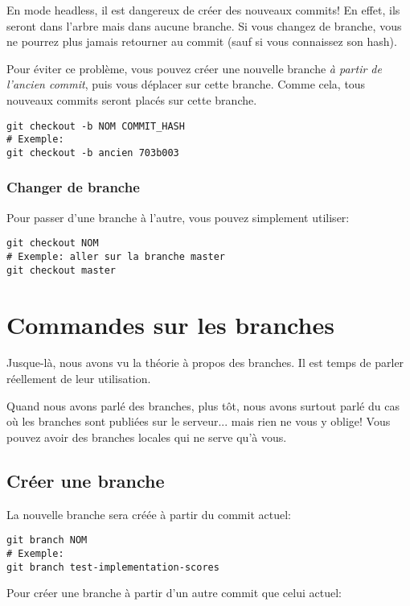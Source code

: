 \documentclass[10pt,a4paper]{article}
\begin{document}
En mode headless, il est dangereux de créer des nouveaux commits! En effet, ils seront dans l'arbre mais dans aucune branche. Si vous changez de branche, vous ne pourrez plus jamais retourner au commit (sauf si vous connaissez son hash).

Pour éviter ce problème, vous pouvez créer une nouvelle branche \textit{à partir de l'ancien commit}, puis vous déplacer sur cette branche. Comme cela, tous nouveaux commits seront placés sur cette branche.

\begin{verbatim}
git checkout -b NOM COMMIT_HASH
# Exemple:
git checkout -b ancien 703b003
\end{verbatim}

\subsubsection{Changer de branche}

Pour passer d'une branche à l'autre, vous pouvez simplement utiliser:

\begin{verbatim}
git checkout NOM
# Exemple: aller sur la branche master
git checkout master
\end{verbatim}

\section{Commandes sur les branches}

Jusque-là, nous avons vu la théorie à propos des branches. Il est temps de parler réellement de leur utilisation.

Quand nous avons parlé des branches, plus tôt, nous avons surtout parlé du cas où les branches sont publiées sur le serveur... mais rien ne vous y oblige! Vous pouvez avoir des branches locales qui ne serve qu'à vous.

\subsection{Créer une branche}

La nouvelle branche sera créée à partir du commit actuel:

\begin{verbatim}
git branch NOM
# Exemple:
git branch test-implementation-scores
\end{verbatim}

Pour créer une branche à partir d'un autre commit que celui actuel:
\end{document}
